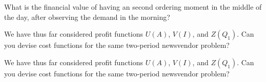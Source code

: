 \begin{exercise}
What is the financial value of having an second ordering moment in the middle of the day, after observing the demand in the morning?
   \begin{comment}
     TBD.
   \end{comment}
\end{exercise}

\begin{exercise}
We have thus far considered profit functions $U(A)$, $V(I)$, and $Z(Q_1)$. Can you devise cost functions for the same two-period newsvendor problem?
   \begin{comment}
     TBD.
   \end{comment}
\end{exercise}

\begin{exercise}
We have thus far considered profit functions $U(A)$, $V(I)$, and $Z(Q_1)$. Can you devise cost functions for the same two-period newsvendor problem?
   \begin{comment}
     TBD.
   \end{comment}
\end{exercise}

